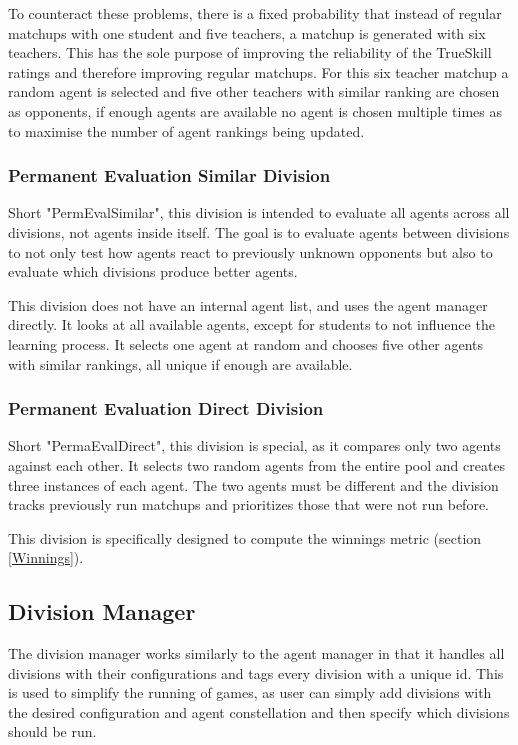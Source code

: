 To counteract these problems, there is a fixed probability that instead of regular matchups with one student and five teachers, a matchup is generated with six teachers. This has the sole purpose of improving the reliability of the TrueSkill ratings and therefore improving regular matchups. For this six teacher matchup a random agent is selected and five other teachers with similar ranking are chosen as opponents, if enough agents are available no agent is chosen multiple times as to maximise the number of agent rankings being updated.

\subsubsection{Permanent Evaluation Similar Division}\label{PermEvalSimilarDiv}
Short "PermEvalSimilar", this division is intended to evaluate all agents across all divisions, not agents inside itself. The goal is to evaluate agents between divisions to not only test how agents react to previously unknown opponents but also to evaluate which divisions produce better agents.

This division does not have an internal agent list, and uses the agent manager directly. It looks at all available agents, except for students to not influence the learning process. It selects one agent at random and chooses five other agents with similar rankings, all unique if enough are available.

\subsubsection{Permanent Evaluation Direct Division}\label{PermEvaldirectDiv}
Short "PermaEvalDirect", this division is special, as it compares only two agents against each other. It selects two random agents from the entire pool and creates three instances of each agent. The two agents must be different and the division tracks previously run matchups and prioritizes those that were not run before.

This division is specifically designed to compute the winnings metric (section \ref{Winnings}).

\subsection{Division Manager}
The division manager works similarly to the agent manager in that it handles all divisions with their configurations and tags every division with a unique id. This is used to simplify the running of games, as user can simply add divisions with the desired configuration and agent constellation and then specify which divisions should be run.

